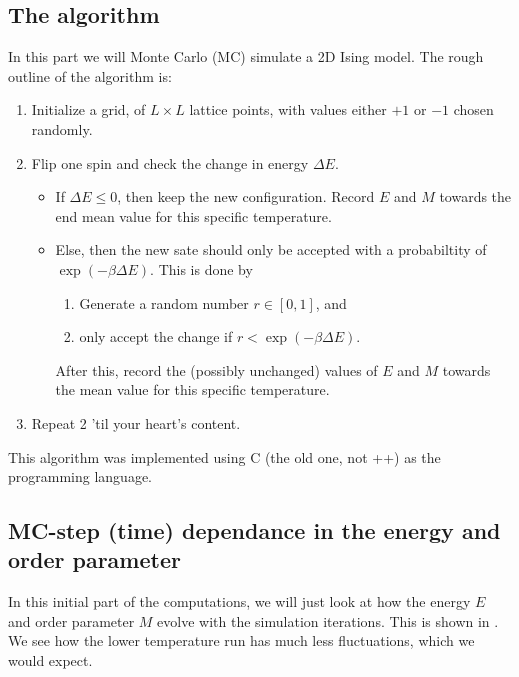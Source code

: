\documentclass[11pt,letter, swedish, english
]{article}
\newcommand{\DE}{\ensuremath{\Delta{E}}}
\begin{document}
\subsection{The algorithm}
In this part we will Monte Carlo (MC) simulate a 2D Ising model. The
rough outline of the algorithm is:
\begin{enumerate}
\item Initialize a grid, of $L\times L$ lattice points, with values
either $+1$ or $-1$ chosen randomly.
\item Flip one spin and check the change in energy $\DE$.
\begin{itemize}
\item If $\DE\le0$, then keep the new configuration. Record $E$ and
$M$ towards the end mean value for this specific
temperature\footnotemark{}.
\item Else, then the new sate should only be accepted with a
probabiltity of $\exp(-\beta\DE)$. This is done by
\begin{enumerate}
\item Generate a random number $r\in[0, 1]$, and
\item only accept the change if $r<\exp(-\beta\DE)$.
\end{enumerate}
\addtocounter{footnote}{-1}
After this, record the (possibly unchanged) values of $E$ and $M$
towards the mean value for this specific temperature\footnotemark{}. 
\end{itemize}
\item Repeat 2 'til your heart's content.
\end{enumerate}
This algorithm was implemented using C (the old one, not ++) as the
programming language. 






\subsection{MC-step (time) dependance in the energy 
and order parameter}
In this initial part of the computations, we will just look at how the
energy $E$ and order parameter $M$ evolve with the simulation
iterations. This is shown in . We see how the lower
temperature run has much less fluctuations, which we would expect.
\end{document}
